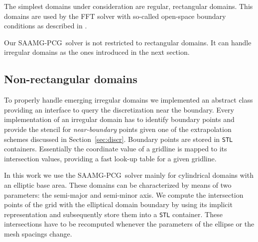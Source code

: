 \documentclass[a4paper,10pt,3p,preprint,pdftex]{elsarticle}
\newcommand{\oursolver}{\textsc{SAAMG-PCG}}
\begin{document}
The simplest domains under consideration are regular, rectangular
domains.  This domains are used by the FFT solver with so-called
open-space boundary conditions as described in \cite{hoea:88}. 


Our \oursolver\ solver is not restricted to rectangular domains.  It can handle
irregular domains as the ones introduced in the next section.

\subsection*{Non-rectangular domains}

To properly handle emerging irregular domains we implemented an abstract
class providing an interface to query the discretization near the
boundary.  Every implementation of an irregular domain has to identify
boundary points and provide the stencil for \textit{near-boundary}
points given one of the extrapolation schemes discussed in
Section~\ref{sec:discr}.  Boundary points are stored in \texttt{STL}
containers. Essentially the coordinate value of a gridline is mapped to
its intersection values, providing a fast look-up table for a given
gridline.

In this work we use the \oursolver\ solver mainly for cylindrical domains with
an elliptic base area.  These domains can be characterized by means of
two parameters: the semi-major and semi-minor axis.  We compute the
intersection points of the grid with the elliptical domain boundary by
using its implicit representation and subsequently store them into a
\texttt{STL} container.  These intersections have to be recomputed
whenever the parameters of the ellipse or the mesh spacings change.


\end{document}
